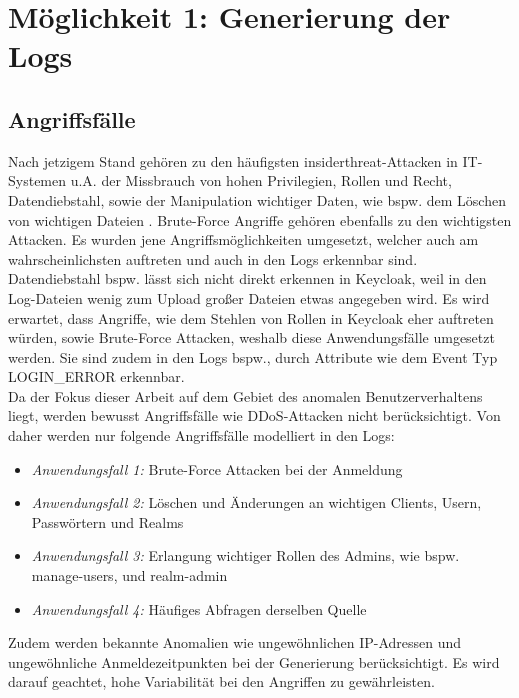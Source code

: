 \documentclass[a4paper,12pt]{article}
\begin{document}
	
	\section{Möglichkeit 1: Generierung der Logs}
	\subsection{Angriffsfälle}
	Nach jetzigem Stand gehören zu den häufigsten \gls{insiderthreat}-Attacken in IT-Systemen u.A. der Missbrauch von hohen Privilegien, Rollen und Recht, Datendiebstahl, sowie der Manipulation wichtiger Daten, wie bspw. dem Löschen von wichtigen Dateien \cite{singh2022insiderthreats}. Brute-Force Angriffe gehören ebenfalls zu den wichtigsten Attacken. Es wurden jene Angriffsmöglichkeiten umgesetzt, welcher auch am wahrscheinlichsten auftreten und auch in den Logs erkennbar sind. Datendiebstahl bspw. lässt sich nicht direkt erkennen in Keycloak, weil in den Log-Dateien wenig zum Upload großer Dateien etwas angegeben wird. Es wird erwartet, dass Angriffe, wie dem Stehlen von Rollen in Keycloak eher auftreten würden, sowie Brute-Force Attacken, weshalb diese Anwendungsfälle umgesetzt werden. Sie sind zudem in den Logs bspw., durch Attribute wie dem Event Typ LOGIN\_ERROR erkennbar. 
	\\[0.5em]
	Da der Fokus dieser Arbeit auf dem Gebiet des anomalen Benutzerverhaltens liegt, werden bewusst Angriffsfälle wie DDoS-Attacken nicht berücksichtigt. Von daher werden nur folgende Angriffsfälle modelliert in den Logs:
	
	\begin{itemize}
		\item \textit{Anwendungsfall 1: }Brute-Force Attacken bei der Anmeldung
		\item \textit{Anwendungsfall 2: } Löschen und Änderungen an wichtigen Clients, Usern, Passwörtern und Realms
		\item \textit{Anwendungsfall 3: } Erlangung wichtiger Rollen des Admins, wie bspw. manage-users, und realm-admin
		\item \textit{Anwendungsfall 4: } Häufiges Abfragen derselben Quelle
	\end{itemize}
	Zudem werden bekannte Anomalien wie ungewöhnlichen IP-Adressen und ungewöhnliche Anmeldezeitpunkten bei der Generierung berücksichtigt. Es wird darauf geachtet, hohe Variabilität bei den Angriffen zu gewährleisten.
	
\end{document}
